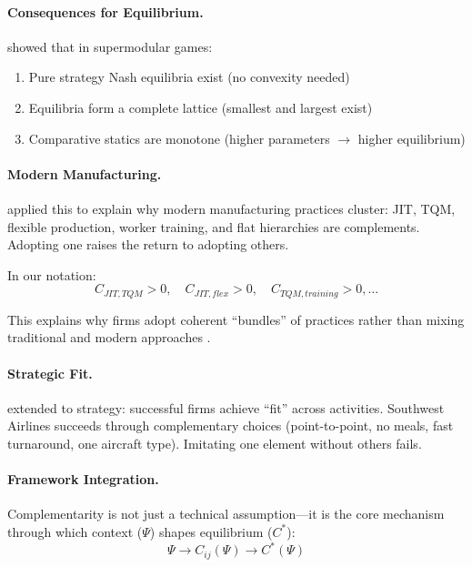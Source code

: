 \paragraph{Consequences for Equilibrium.}
\citet{milgromroberts1990compare} showed that in supermodular games:
\begin{enumerate}
  \item Pure strategy Nash equilibria exist (no convexity needed)
  \item Equilibria form a complete lattice (smallest and largest exist)
  \item Comparative statics are monotone (higher parameters $\to$ higher equilibrium)
\end{enumerate}

\paragraph{Modern Manufacturing.}
\citet{milgromroberts1990modern} applied this to explain why modern manufacturing
practices cluster: JIT, TQM, flexible production, worker training, and flat hierarchies
are complements. Adopting one raises the return to adopting others.

In our notation:
\begin{equation}
  C_{JIT,TQM} > 0, \quad C_{JIT,flex} > 0, \quad C_{TQM,training} > 0, \ldots
\end{equation}

This explains why firms adopt coherent ``bundles'' of practices rather than
mixing traditional and modern approaches \citep{ichniowski1997}.

\paragraph{Strategic Fit.}
\citet{milgromroberts1995} extended to strategy: successful firms achieve
``fit'' across activities. Southwest Airlines succeeds through complementary
choices (point-to-point, no meals, fast turnaround, one aircraft type).
Imitating one element without others fails.

\paragraph{Framework Integration.}
Complementarity is not just a technical assumption---it is the core mechanism
through which context ($\Psi$) shapes equilibrium ($C^*$):
\begin{equation}
  \Psi \to C_{ij}(\Psi) \to C^*(\Psi)
\end{equation}

